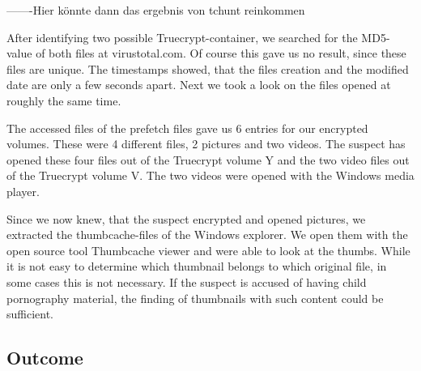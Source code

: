 -------Hier könnte dann das ergebnis von tchunt reinkommen

After identifying two possible Truecrypt-container, we searched for the MD5-value of both files at virustotal.com. Of course this gave us no result, since these files are unique. The timestamps showed, that the files creation and the modified date are only a few seconds apart. Next we took a look on the files opened at roughly the same time. 

The accessed files of the prefetch files gave us 6 entries for our encrypted volumes. These were 4 different files, 2 pictures and two videos.
The suspect has opened these four files out of the Truecrypt volume Y and the two video files out of the Truecrypt volume V. The two videos were opened with the Windows media player.

Since we now knew, that the suspect encrypted and opened pictures, we extracted the thumbcache-files of the Windows explorer. We open them with the open source tool Thumbcache viewer and were able to look at the thumbs. While it is not easy to determine which thumbnail belongs to which original file, in some cases this is not necessary. If the suspect is accused of having child pornography material, the finding of thumbnails with such content could be sufficient.


\subsection{Outcome}

